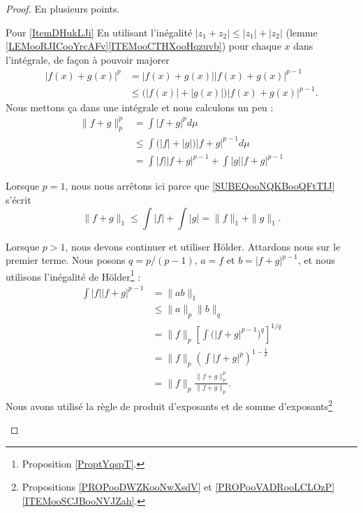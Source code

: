 \begin{proof}
    En plusieurs points.
    \begin{subproof}
        \item[Pour \ref{ItemDHukLJi}]
            En utilisant l'inégalité \( | z_1+z_2 |\leq | z_1 |+| z_2 |\) (lemme \ref{LEMooRJICooYrcAFv}\ref{ITEMooCTHXooHqzuvb}) pour chaque \( x\) dans l'intégrale, de façon à pouvoir majorer
            \begin{subequations}
                \begin{align}
                    | f(x)+g(x) |^p&=| f(x)+g(x) | |f(x)+g(x) |^{p-1}\\
                    &\leq\big( | f(x) |+| g(x) | \big)| f(x)+g(x) |^{p-1}.
                \end{align}
            \end{subequations}
            Nous mettons ça dans une intégrale et nous calculons un peu :
            \begin{subequations}        \label{SUBEQSooGWMTooDBXSgL}
                \begin{align}
                    \| f+g \|^p_p&=\int| f+g |^pd\mu\\
                    &\leq \int\big( | f |+| g | \big)| f+g |^{p-1}d\mu\\
                    &=\int| f | |f+g |^{p-1}+\int| g | |f+g |^{p-1} \label{SUBEQooNQKBooQFtTIJ}
                \end{align}
            \end{subequations}

            Lorsque \( p=1\), nous nous arrêtons ici parce que \eqref{SUBEQooNQKBooQFtTIJ} s'écrit
            \begin{equation}
                \| f+g \|_1\leq\int| f |+\int| g |=\| f \|_1+\| g \|_1.
            \end{equation}

            Lorsque \( p>1\), nous devons continuer et utiliser Hölder. Attardons nous sur le premier terme. Nous posons \( q=p/(p-1)\), \( a=f\) et \( b=| f+g |^{p-1}\), et nous utilisons l'inégalité de Hölder\footnote{Proposition \ref{ProptYqspT}.} :
            \begin{subequations}        \label{SUBEQSooFINUooQfIdMS}
                \begin{align}
                    \int| f | |f+g |^{p-1}&=\| ab \|_1\\
                    &\leq \| a \|_p\| b \|_q\\
                    &=\| f \|_p \left[ \int \big( | f+g |^{p-1} \big)^q \right]^{1/q}\\
                    &=\| f \|_p\left( \int| f+g |^p \right)^{1-\frac{1}{ p }}\\
                    &=\| f \|_p\frac{ \| f+g \|_p^p }{ \| f+g \|_p }.
                \end{align}
            \end{subequations}
            Nous avons utilisé la règle de produit d'exposants et de somme d'exposants\footnote{Propositions \ref{PROPooDWZKooNwXsdV} et \ref{PROPooVADRooLCLOzP}\ref{ITEMooSCJBooNVJZah}.}


\end{subproof}
\end{proof}
